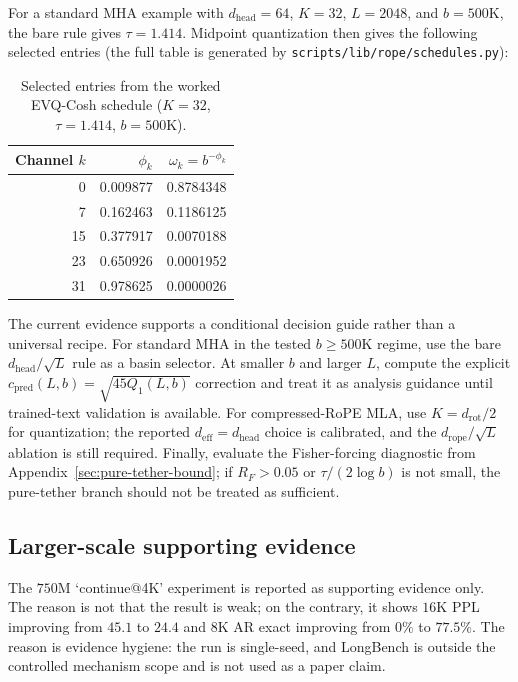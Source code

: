For a standard MHA example with $d_{\mathrm{head}}{=}64$, $K{=}32$, $L{=}2048$, and $b{=}500\mathrm{K}$, the bare rule gives $\tau{=}1.414$. Midpoint quantization then gives the following selected entries (the full table is generated by \texttt{scripts/lib/rope/schedules.py}):

\begin{table}[ht]
\caption{Selected entries from the worked EVQ-Cosh schedule ($K{=}32$, $\tau{=}1.414$, $b{=}500\mathrm{K}$).}
\centering\small
\begin{tabular}{@{}r r r@{}}
\toprule
Channel $k$ & $\phi_k$ & $\omega_k=b^{-\phi_k}$ \\
\midrule
0  & 0.009877 & 0.8784348 \\
7  & 0.162463 & 0.1186125 \\
15 & 0.377917 & 0.0070188 \\
23 & 0.650926 & 0.0001952 \\
31 & 0.978625 & 0.0000026 \\
\bottomrule
\end{tabular}
\end{table}

The current evidence supports a conditional decision guide rather than a universal recipe. For standard MHA in the tested $b{\geq}500\mathrm{K}$ regime, use the bare $d_{\mathrm{head}}/\sqrt{L}$ rule as a basin selector. At smaller $b$ and larger $L$, compute the explicit $c_{\mathrm{pred}}(L,b){=}\sqrt{45Q_1(L,b)}$ correction and treat it as analysis guidance until trained-text validation is available. For compressed-RoPE MLA, use $K{=}d_{\mathrm{rot}}/2$ for quantization; the reported $d_{\mathrm{eff}}{=}d_{\mathrm{head}}$ choice is calibrated, and the $d_{\mathrm{rope}}/\sqrt{L}$ ablation is still required. Finally, evaluate the Fisher-forcing diagnostic from Appendix~\ref{sec:pure-tether-bound}; if $R_F{>}0.05$ or $\tau/(2\log b)$ is not small, the pure-tether branch should not be treated as sufficient.

\subsection{Larger-scale supporting evidence}

The \(750\mathrm{M}\) `continue@4K' experiment is reported as supporting evidence only. The reason is not that the result is weak; on the contrary, it shows \(16\mathrm{K}\) PPL improving from \(45.1\) to \(24.4\) and \(8\mathrm{K}\) AR exact improving from \(0\%\) to \(77.5\%\). The reason is evidence hygiene: the run is single-seed, and LongBench is outside the controlled mechanism scope and is not used as a paper claim.

